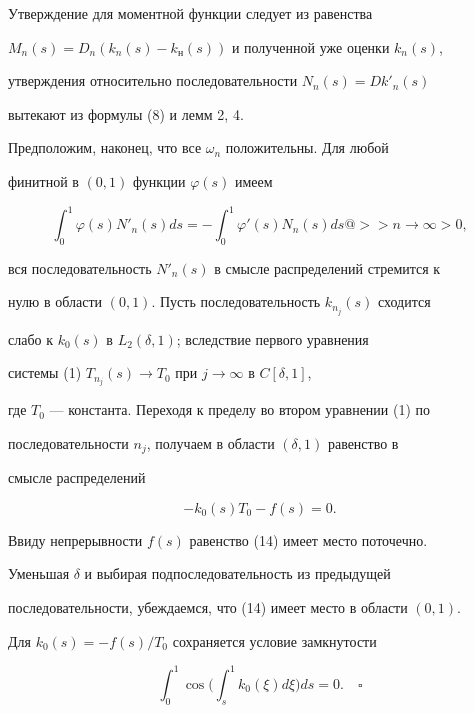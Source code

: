 Утверждение для моментной функции следует из равенства


$M_n(s)=D_n(k_n(s)-k_н(s))$ и полученной уже оценки $k_n(s)$,


утверждения относительно последовательности $N_n(s)=D {k'_n}(s)$


вытекают из формулы (8) и лемм 2, 4.





Предположим, наконец, что все $\omega_n$ положительны. Для любой


финитной в $(0,1)$ функции $\varphi (s)$ имеем


$$


\int_0^1 \varphi (s) N'_n(s) ds=-\int_0^1 {\varphi}' (s) N_n(s) ds


@>>{n\to \infty}>0,


$$


вся последовательность ${N'_n}(s)$ в смысле распределений стремится к


нулю в области $(0,1)$. Пусть последовательность $k_{n_j}(s)$ сходится


слабо к $k_0(s)$ в $L_2(\delta ,1)$; вследствие первого уравнения


системы (1)\; $T_{n_j}(s) \to T_0$ при $j \to \infty$ в $C[\delta ,1]$,


где $T_0$ --- константа. Переходя к пределу во втором уравнении (1) по


последовательности $n_j$, получаем в области $(\delta,1)$ равенство в


смысле распределений


\begin{equation}


-k_0(s) T_0-f(s)=0.


\end{equation}





Ввиду непрерывности $f(s)$ равенство (14) имеет место поточечно.


Уменьшая $\delta $ и выбирая подпоследовательность из предыдущей


последовательности, убеждаемся, что (14) имеет место в области $(0,1)$.


Для $k_0(s)=-f(s)/T_0$ сохраняется условие замкнутости


$$


\int_0^1 \cos \bigg(\int_s^1 k_0 (\xi)d \xi \bigg) ds=0.\quad\square


$$





